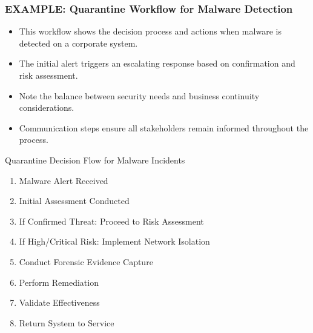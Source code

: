 \documentclass{beamer}
\begin{document}
\begin{frame}
\frametitle{EXAMPLE: Quarantine Workflow for Malware Detection}
\begin{itemize}
\item This workflow shows the decision process and actions when malware is detected on a corporate system.
\item The initial alert triggers an escalating response based on confirmation and risk assessment.
\item Note the balance between security needs and business continuity considerations.
\item Communication steps ensure all stakeholders remain informed throughout the process.
\end{itemize}

\begin{block}{Quarantine Decision Flow for Malware Incidents}
\scriptsize
\begin{enumerate}
\item Malware Alert Received
\item Initial Assessment Conducted
\item If Confirmed Threat: Proceed to Risk Assessment
\item If High/Critical Risk: Implement Network Isolation
\item Conduct Forensic Evidence Capture
\item Perform Remediation
\item Validate Effectiveness
\item Return System to Service
\end{enumerate}
\end{block}
\end{frame}
\end{document}
